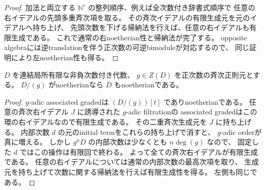 \begin{proof}
 加法と両立する \(\mathbb N^r\) の整列順序、例えば全次数付き辞書式順序で
 任意の右イデアルの先頭多重斉次項を取る。
 その斉次イデアルの有限生成元を元のイデアルへ持ち上げ、
 先頭次数を下げる帰納法を行えば、任意の右イデアルも有限生成である。
 これで通常の右noetherian性と帰納法が完了する。
 opposite algebraには逆translationを伴う正次数の可逆bimoduleが対応するので、
 同じ証明により左noetherian性も得る。
\end{proof}

\begin{lemma}[正次数中心正則元からのnoetherian性の持ち上げ]
 \label{lem:central-noetherian-lift}
 \(D\) を連結局所有限な非負次数付き代数、
 \(g\in Z(D)\) を正次数の斉次正則元とする。
 \(D/(g)\) がnoetherianなら \(D\) もnoetherianである。
\end{lemma}
\begin{proof}
 \(g\)-adic associated gradedは \((D/(g))[t]\) でありnoetherianである。
 任意の斉次右イデアル \(J\) に誘導された \(g\)-adic filtrationの
 associated gradedはこの環の右イデアルなので有限生成である。
 その二重斉次生成元を \(J\) に持ち上げる。
 内部次数 \(d\) の元のinitial termをこれらの持ち上げで消すと、
 \(g\)-adic orderが真に増える。
 しかし \(g^nD\) の内部次数は少なくとも \(n\deg(g)\) なので、
 固定した \(d\) ではこの操作は有限回で終わる。
 よって全ての斉次右イデアルが有限生成である。
 任意の右イデアルについては通常の内部次数の最高次項を取り、
 生成元を持ち上げて次数に関する帰納法を行えば有限生成性を得る。
 左側も同じである。
\end{proof}

